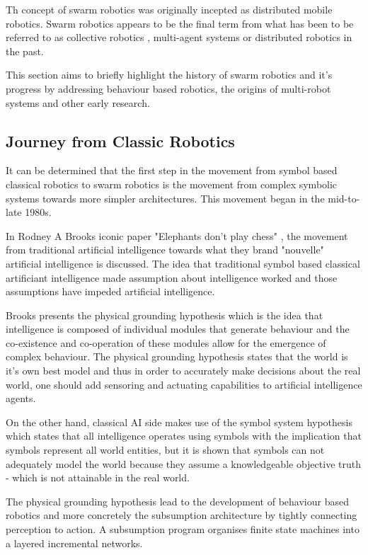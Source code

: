 Th concept of swarm robotics was originally incepted as distributed mobile robotics. 
Swarm robotics appears to be the final term from what has been to be referred to as collective robotics \cite{kube1993collective}, multi-agent systems \cite{jennings1993commitments} or distributed robotics \cite{gauthier1987interprocess} in the past. 

This section aims to briefly highlight the history of swarm robotics and it's progress by addressing behaviour based robotics, the origins of multi-robot systems and other early research.

\subsection{Journey from Classic Robotics}
\label{journeyfromtraditionalAI}

It can be determined that the first step in the movement from symbol based classical robotics to swarm robotics is the movement from complex symbolic systems towards more simpler architectures. This movement began in the mid-to-late 1980s. 

In Rodney A Brooks iconic paper "Elephants don't play chess" \cite{brooks1990elephants}, the movement from traditional artificial intelligence towards what they brand "nouvelle" artificial intelligence is discussed. The idea that traditional symbol based classical artificiant intelligence made assumption about intelligence worked and those assumptions have impeded artificial intelligence. 

Brooks presents the physical grounding hypothesis which is the idea that intelligence is composed of individual modules that generate behaviour and the co-existence and co-operation of these modules allow for the emergence of complex behaviour. The physical grounding hypothesis states that the world is it's own best model and thus in order to accurately make decisions about the real world, one should add sensoring and actuating capabilities to artificial intelligence agents.

On the other hand, classical AI side makes use of the symbol system hypothesis which states that all intelligence operates using symbols with the implication that symbols represent all world entities, but it is shown that symbols can not adequately model the world because they assume a knowledgeable objective truth - which is not attainable in the real world. 

The physical grounding hypothesis lead to the development of behaviour based robotics and more concretely the subsumption architecture \cite{brooks1986robust} by tightly connecting perception to action. A subsumption program organises finite state machines into a layered incremental networks. 

